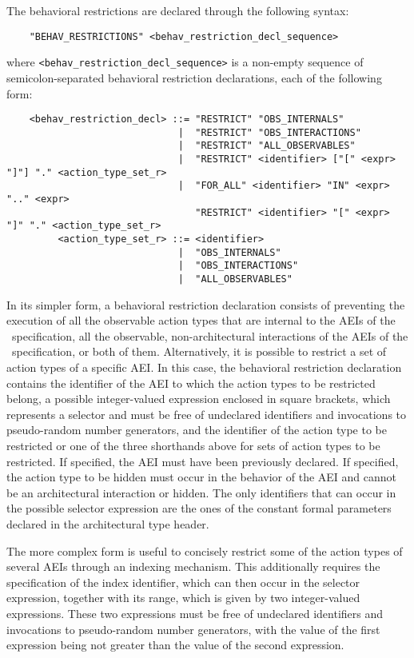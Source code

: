 The behavioral restrictions are declared through the following syntax:

	\begin{verbatim}
    "BEHAV_RESTRICTIONS" <behav_restriction_decl_sequence>
	\end{verbatim}

\noindent where {\tt <behav\_restriction\_decl\_sequence>} is a non-empty sequence of semicolon-separated
behavioral restriction declarations, each of the following form:

	\begin{verbatim}
    <behav_restriction_decl> ::= "RESTRICT" "OBS_INTERNALS"
                              |  "RESTRICT" "OBS_INTERACTIONS"
                              |  "RESTRICT" "ALL_OBSERVABLES"
                              |  "RESTRICT" <identifier> ["[" <expr> "]"] "." <action_type_set_r>
                              |  "FOR_ALL" <identifier> "IN" <expr> ".." <expr>
                                 "RESTRICT" <identifier> "[" <expr> "]" "." <action_type_set_r>
         <action_type_set_r> ::= <identifier>
                              |  "OBS_INTERNALS"
                              |  "OBS_INTERACTIONS"
                              |  "ALL_OBSERVABLES"
	\end{verbatim}

In its simpler form, a behavioral restriction declaration consists of preventing the execution of all the
observable action types that are internal to the AEIs of the \aemilia\ specification, all the observable,
non-architectural interactions of the AEIs of the \aemilia\ specification, or both of them. Alternatively,
it is possible to restrict a set of action types of a specific AEI. In this case, the behavioral restriction
declaration contains the identifier of the AEI to which the action types to be restricted belong, a possible
integer-valued expression enclosed in square brackets, which represents a selector and must be free of
undeclared identifiers and invocations to pseudo-random number generators, and the identifier of the action
type to be restricted or one of the three shorthands above for sets of action types to be restricted. If
specified, the AEI must have been previously declared. If specified, the action type to be hidden must occur
in the behavior of the AEI and cannot be an architectural interaction or hidden. The only identifiers that
can occur in the possible selector expression are the ones of the constant formal parameters declared in the
architectural type header.

The more complex form is useful to concisely restrict some of the action types of several AEIs through an
indexing mechanism. This additionally requires the specification of the index identifier, which can then
occur in the selector expression, together with its range, which is given by two integer-valued expressions.
These two expressions must be free of undeclared identifiers and invocations to pseudo-random number
generators, with the value of the first expression being not greater than the value of the second
expression.

